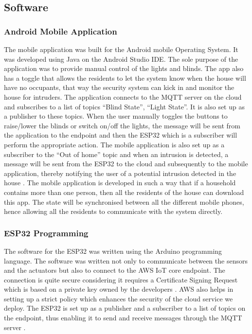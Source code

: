 \documentclass[conference]{IEEEtran}
\begin{document}
\subsection{Software}

\subsubsection{Android Mobile Application}

The mobile application was built for the Android mobile Operating System. It was developed using Java on the Android Studio IDE. The sole purpose of the application was to provide manual control of the lights and blinds. The app also has a toggle that allows the residents to let the system know when the house will have no occupants, that way the security system can kick in and monitor the house for intruders. The application connects to the MQTT server on the cloud and subscribes to a list of topics “Blind State”, “Light State”. It is also set up as a publisher to these topics. When the user manually toggles the buttons to raise/lower the blinds or switch on/off the lights, the message will be sent from the application to the endpoint and then the ESP32 which is a subscriber will perform the appropriate action. The mobile application is also set up as a subscriber to the “Out of home” topic and when an intrusion is detected, a message will be sent from the ESP32 to the cloud and subsequently to the mobile application, thereby notifying the user of a potential intrusion detected in the house \cite{android_pubsub}. The mobile application is developed in such a way that if a household contains more than one person, then all the residents of the house can download this app. The state will be synchronised between all the different mobile phones, hence allowing all the residents to communicate with the system directly. 

\subsubsection{ESP32 Programming}

The software for the ESP32 was written using the Arduino programming language. The software was written not only to communicate between the sensors and the actuators but also to connect to the AWS IoT core endpoint. The connection is quite secure considering it requires a Certificate Signing Request which is based on a private key owned by the developers \cite{esp_sec}. AWS also helps in setting up a strict policy which enhances the security of the cloud service we deploy. The ESP32 is set up as a publisher and a subscriber to a list of topics on the endpoint, thus enabling it to send and receive messages through the MQTT server \cite{esp_mqtt, esp_aws}.
\end{document}
